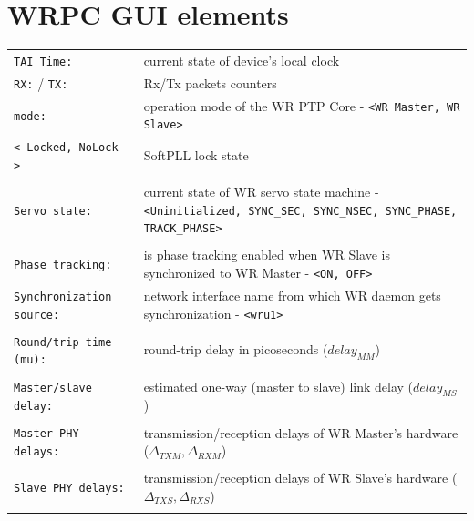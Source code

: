 \documentclass[a4paper, 12pt]{article}
\newcommand{\code}[1]{\texttt{#1}}
\begin{document}
\clearpage
\section{WRPC GUI elements}
\label{WRPC GUI elements}

\footnotesize
\begin{longtable}{  p{4.5cm}  p{10cm} }

  \code{TAI Time:} & current state of device's local clock \\

  \code{RX:} / \code{TX:} & Rx/Tx packets counters\\

  \code{mode:} & operation mode of the WR PTP Core - \code{<WR Master, WR Slave>}\\

  \code{< Locked, NoLock >} & SoftPLL lock state\\
 & \\

  \code{Servo state:} & current state of WR servo state machine -
\code{<Uninitialized, SYNC\_SEC, SYNC\_NSEC, SYNC\_PHASE, TRACK\_PHASE>}\\
 & \\

  \code{Phase tracking:} & is phase tracking enabled when WR Slave is
synchronized to WR Master - \code{<ON, OFF>}\\

  \code{Synchronization source:} & network interface name from which WR
daemon gets synchronization - \code{<wru1>}\\
 & \\

  \code{Round\-/trip time (mu):} & round-trip delay in picoseconds
(\( delay_{MM} \))\\
 & \\

  \code{Master\-/slave delay:} & estimated one-way (master to slave) link
delay (\( delay_{MS} \))\\
 & \\

  \code{Master PHY delays:} & transmission/reception delays of WR 
Master's hardware (\( \Delta_{TXM}, \Delta_{RXM} \))\\
 & \\

  \code{Slave PHY delays:} & transmission/reception delays of WR Slave's
hardware (\( \Delta_{TXS}, \Delta_{RXS} \))\\
 & \\


\end{longtable}
\end{document}

